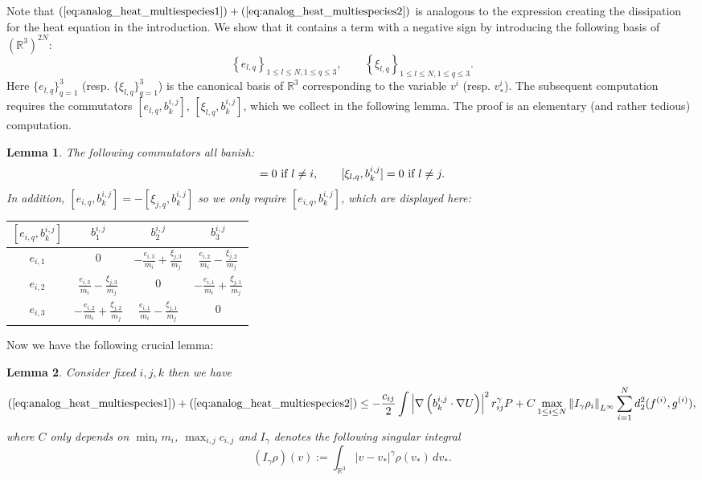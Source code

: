 \documentclass[10pt,oneside]{amsart}
\numberwithin{equation}{section}
\numberwithin{definition}{section}
\numberwithin{theorem}{section}
\newtheorem{lemma}{Lemma}
\numberwithin{lemma}{section}
\begin{document}
%
Note that $(\ref{eq:analog_heat_multiespecies1})+(\ref{eq:analog_heat_multiespecies2})$ is analogous to the expression creating the dissipation for the heat equation in the introduction. We show that it contains a term with a negative sign by introducing the following basis of $(\mathbb R^3)^{2N}$:
%
\begin{equation*}
  \left\{ e_{l,q}\right\} _{1\leq l\leq N,1\leq q\leq3},\qquad\left\{ \xi_{l,q}\right\} _{1\leq l\leq N,1\leq q\leq3}.
\end{equation*}
%
Here $\{e_{l,q}\}_{q=1}^3$ (resp. $\{\xi_{l,q}\}_{q=1}^3$) is the canonical basis of $\mathbb{R}^3$ corresponding to the variable $v^i$ (resp. $v_*^i$).
The subsequent computation requires the commutators $[e_{l,q},b_{k}^{i,j}]$, $[\xi_{l,q},b_{k}^{i,j}]$, which we collect in the following lemma. The proof is an elementary (and rather tedious) computation.
% 
\begin{lemma}
  The following commutators all banish:
  \begin{equation*}
    [e_{l,q},b_{k}^{i,j}]=0\textnormal{ if }l\neq i,\qquad[\xi_{l,q},b_{k}^{i,j}]=0\textnormal{ if }l\neq j.
  \end{equation*}
  In addition, $[e_{i,q},b_{k}^{i,j}]=-[\xi_{j,q},b_{k}^{i,j}]$ so we only require $[e_{i,q},b_{k}^{i,j}]$, which are displayed here:
  \renewcommand{\arraystretch}{3.5}
  \setlength{\extrarowheight}{-3pt}
  \begin{table}[H]
    \centering%
    \begin{tabular}{c|c|c|c} 
      $[e_{i,q},b_{k}^{i,j}]$ & $b_{1}^{i,j}$ & $b_{2}^{i,j}$ & $b_{3}^{i,j}$\tabularnewline
      \hline 
      $e_{i,1}$ & $0$ & ${\displaystyle -\frac{e_{i,3}}{m_{i}}+\frac{\xi_{j,3}}{m_{j}}}$ & $\displaystyle\frac{e_{i,2}}{m_{i}}-\frac{\xi_{j,2}}{m_{j}}$\tabularnewline
      \hline 
      $e_{i,2}$ & ${\displaystyle \frac{e_{i,3}}{m_{i}}-\frac{\xi_{j,3}}{m_{j}}}$ & $0$ & ${\displaystyle -\frac{e_{i,1}}{m_{i}}+\frac{\xi_{j,1}}{m_{j}}}$\tabularnewline
      \hline 
      $e_{i,3}$ & ${\displaystyle -\frac{e_{i,2}}{m_{i}}+\frac{\xi_{j,2}}{m_{j}}}$ & ${\displaystyle \frac{e_{i,1}}{m_{i}}-\frac{\xi_{j,1}}{m_{j}}}$ & $0$\tabularnewline
    \end{tabular}
  \end{table}
\end{lemma}
% 
Now we have the following crucial lemma:
% 
\begin{lemma}\label{lem:commutators}
  Consider fixed $i,j,k$ then we have
  \begin{equation*}
    (\ref{eq:analog_heat_multiespecies1})+(\ref{eq:analog_heat_multiespecies2}) \leq 
    -\frac{c_{ij}}{2} \int\left|\nabla\left(b_{k}^{i,j}\cdot\nabla U\right)\right|^{2}r_{ij}^{\gamma}P + C\max_{1\leq i\leq N}\left\Vert I_{\gamma}\rho_{i}\right\Vert _{L^{\infty}}\sum_{i=1}^Nd_2^2(f^{(i)},g^{(i)}),
  \end{equation*}
  where $C$ only depends on $\min_i m_i$, $\max_{i,j}c_{i,j}$ and $I_\gamma$ denotes the following singular integral
  \begin{equation}\label{eq:singular_integral}
    (I_{\gamma}\rho)(v):=\int_{\mathbb R^3}\left|v-v_*\right|^{\gamma}\rho(v_*)\,dv_*.
  \end{equation}
\end{lemma}
\end{document}
